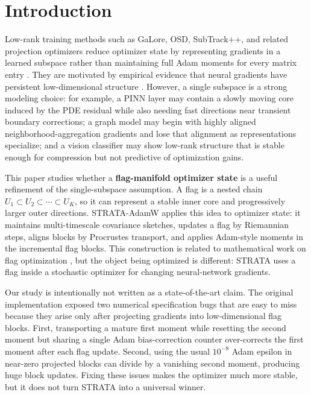 \section{Introduction}
Low-rank training methods such as GaLore, OSD, SubTrack++, and related projection optimizers reduce optimizer state by representing gradients in a learned subspace rather than maintaining full Adam moments for every matrix entry \cite{zhao2024galore,su2025galore2,liang2024osd,rajabi2025subtrackpp,rajabi2024grasstracklllm,refael2025sumo,apollo2024,grass2024,lotus2026}. They are motivated by empirical evidence that neural gradients have persistent low-dimensional structure \cite{thomas2026nosubspace,huang2026spectra,gradsubspace_survey2023}. However, a single subspace is a strong modeling choice: for example, a PINN layer may contain a slowly moving core induced by the PDE residual while also needing fast directions near transient boundary corrections; a graph model may begin with highly aligned neighborhood-aggregation gradients and lose that alignment as representations specialize; and a vision classifier may show low-rank structure that is stable enough for compression but not predictive of optimization gains.

This paper studies whether a \textbf{flag-manifold optimizer state} is a useful refinement of the single-subspace assumption. A flag is a nested chain $U_1\subset U_2\subset\cdots\subset U_K$, so it can represent a stable inner core and progressively larger outer directions. STRATA-AdamW applies this idea to optimizer state: it maintains multi-timescale covariance sketches, updates a flag by Riemannian steps, aligns blocks by Procrustes transport, and applies Adam-style moments in the incremental flag blocks. This construction is related to mathematical work on flag optimization \cite{ye2022flag,lai2022simpler,szwagier2025nested,jin2025online,funwithflags2024,xiao2026flagvarieties,ye2021flagtool,flagdecomp2025}, but the object being optimized is different: STRATA uses a flag inside a stochastic optimizer for changing neural-network gradients.

Our study is intentionally not written as a state-of-the-art claim. The original implementation exposed two numerical specification bugs that are easy to miss because they arise only after projecting gradients into low-dimensional flag blocks. First, transporting a mature first moment while resetting the second moment but sharing a single Adam bias-correction counter over-corrects the first moment after each flag update. Second, using the usual $10^{-8}$ Adam epsilon in near-zero projected blocks can divide by a vanishing second moment, producing huge block updates. Fixing these issues makes the optimizer much more stable, but it does not turn STRATA into a universal winner.

